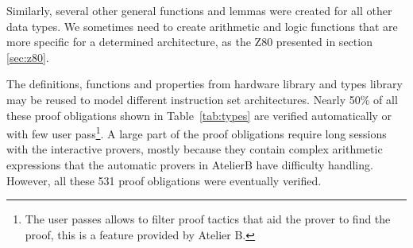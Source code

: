 \documentclass[a4paper]{llncs}
\begin{document}
%
%
%
%

Similarly, several other general functions and lemmas were created for
all other data types.  We sometimes need to create arithmetic and
logic functions that are more specific for a determined
architecture, as the Z80 presented in section \ref{sec:z80}.

The definitions, functions and properties from hardware library and
types library may be reused to model different instruction set
architectures. Nearly 50\% of all these proof obligations shown in
Table~\ref{tab:types} are verified automatically or with few user
pass\footnote{The user passes allows to filter proof tactics that aid
  the prover to find the proof, this is a feature provided by Atelier
  B.}. A large part of the proof obligations require long sessions
with the interactive provers, mostly because they contain complex
arithmetic expressions that the automatic provers in AtelierB have
difficulty handling. However, all these 531 proof obligations were
eventually verified.
\end{document}
